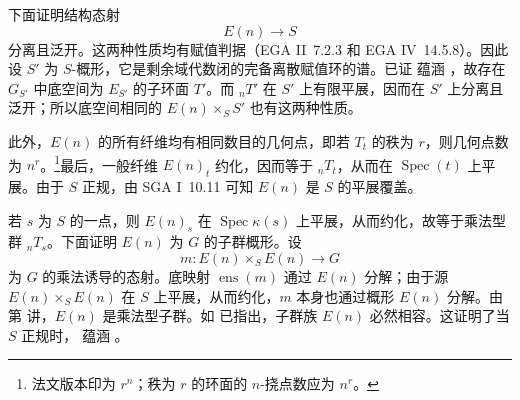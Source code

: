 下面证明结构态射
\[
  E(n)\longrightarrow S
\]
分离且泛开。这两种性质均有赋值判据（EGA II~7.2.3 和 EGA IV~14.5.8）。因此设 \(S'\) 为 \(S\)-概形，它是剩余域代数闭的完备离散赋值环的谱。已证  蕴涵 ，故存在 \(G_{S'}\) 中底空间为 \(E_{S'}\) 的子环面 \(T'\)。而 \({}_nT'\) 在 \(S'\) 上有限平展，因而在 \(S'\) 上分离且泛开；所以底空间相同的 \(E(n)\times_S S'\) 也有这两种性质。

此外，\(E(n)\) 的所有纤维均有相同数目的几何点，即若 \(T_t\) 的秩为 \(r\)，则几何点数为 \(n^r\)。\footnote{法文版本印为 \(r^n\)；秩为 \(r\) 的环面的 \(n\)-挠点数应为 \(n^r\)。}最后，一般纤维 \(E(n)_t\) 约化，因而等于 \({}_nT_t\)，从而在 \(\operatorname{Spec}(t)\) 上平展。由于 \(S\) 正规，由 SGA I~10.11 可知 \(E(n)\) 是 \(S\) 的平展覆盖。

若 \(s\) 为 \(S\) 的一点，则 \(E(n)_s\) 在 \(\operatorname{Spec}\kappa(s)\) 上平展，从而约化，故等于乘法型群 \({}_nT_s\)。下面证明 \(E(n)\) 为 \(G\) 的子群概形。设
\[
  m:E(n)\times_S E(n)\longrightarrow G
\]
为 \(G\) 的乘法诱导的态射。底映射 \(\operatorname{ens}(m)\) 通过 \(E(n)\) 分解；由于源 \(E(n)\times_S E(n)\) 在 \(S\) 上平展，从而约化，\(m\) 本身也通过概形 \(E(n)\) 分解。由第  讲，\(E(n)\) 是乘法型子群。如  已指出，子群族 \(E(n)\) 必然相容。这证明了当 \(S\) 正规时， 蕴涵 。

